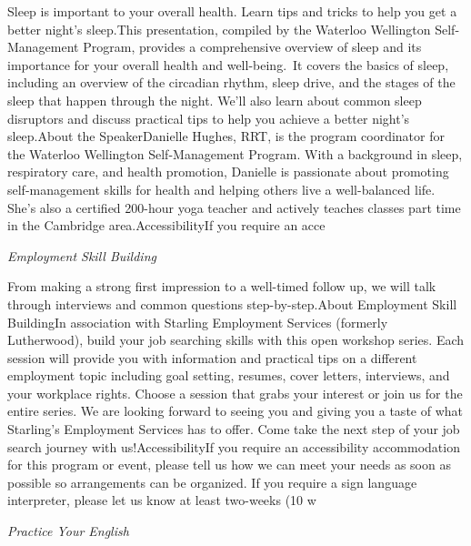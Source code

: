 \documentclass[letterpaper, 10pt]{article}
\newcommand{\subtitle}[1]{\textit{\large #1}\vspace{0.5em}}
\newcommand{\articlecontent}[1]{\small #1\vspace{1em}}
\begin{document}
\begin{multicols}{2}
{Sleep is important to your overall health. Learn tips and tricks to help you get a better night's sleep.This presentation, compiled by the Waterloo Wellington Self-Management Program, provides a comprehensive overview of sleep and its importance for your overall health and well-being. It covers the basics of sleep, including an overview of the circadian rhythm, sleep drive, and the stages of the sleep that happen through the night. We'll also learn about common sleep disruptors and discuss practical tips to help you achieve a better night’s sleep.About the SpeakerDanielle Hughes, RRT, is the program coordinator for the Waterloo Wellington Self-Management Program. With a background in sleep, respiratory care, and health promotion, Danielle is passionate about promoting self-management skills for health and helping others live a well-balanced life. She's also a certified 200-hour yoga teacher and actively teaches classes part time in the Cambridge area.AccessibilityIf you require an acce
}
\vspace{10px}

\subtitle{Employment Skill Building}

\articlecontent{

\qrcode[height=1.5cm]{https://ideaexchange.libnet.info/event/12546710}
\vspace{10px}

From making a strong first impression to a well-timed follow up, we will talk through interviews and common questions step-by-step.About Employment Skill BuildingIn association with Starling Employment Services (formerly Lutherwood), build your job searching skills with this open workshop series. Each session will provide you with information and practical tips on a different employment topic including goal setting, resumes, cover letters, interviews, and your workplace rights. Choose a session that grabs your interest or join us for the entire series. We are looking forward to seeing you and giving you a taste of what Starling's Employment Services has to offer. Come take the next step of your job search journey with us!AccessibilityIf you require an accessibility accommodation for this program or event, please tell us how we can meet your needs as soon as possible so arrangements can be organized. If you require a sign language interpreter, please let us know at least two-weeks (10 w
}
\vspace{10px}

\subtitle{Practice Your English}

\articlecontent{

}
\end{multicols}
\end{document}
